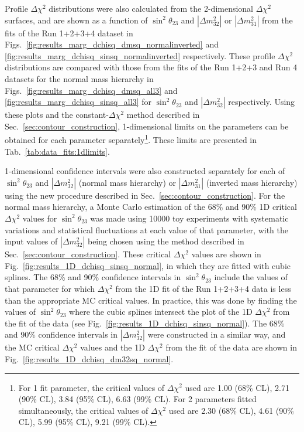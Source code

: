 Profile $\Delta\chi^2$ distributions were also calculated from the 2-dimensional $\Delta\chi^2$ surfaces, and are shown as a 
function of $\sin^{2}\theta_{23}$ and $|\Delta m^{2}_{32}|$ or $|\Delta m^{2}_{31}|$ from the
fits of the Run 1+2+3+4 dataset in 
Figs.\ \ref{fig:results_marg_dchisq_dmsq_normalinverted} and \ref{fig:results_marg_dchisq_sinsq_normalinverted} respectively.
These profile $\Delta\chi^2$ distributions are compared with those from the fits of the Run 1+2+3 and Run 4 datasets for the normal 
mass hierarchy in Figs.\ \ref{fig:results_marg_dchisq_dmsq_all3} and \ref{fig:results_marg_dchisq_sinsq_all3}
for $\sin^{2}\theta_{23}$ and $|\Delta m^{2}_{32}|$ respectively.
Using these plots and the constant-$\Delta\chi^2$ method described in Sec.\ \ref{sec:contour_construction},
1-dimensional limits on the parameters can be obtained for each parameter separately\footnote{
For 1 fit parameter, the critical values of $\Delta{\chi^{2}}$ used are 
1.00 (68\% CL), 2.71 (90\% CL), 3.84 (95\% CL), 6.63 (99\% CL).
For 2 parameters fitted simultaneously, the critical values of $\Delta{\chi^{2}}$ used are 
2.30 (68\% CL), 4.61 (90\% CL), 5.99 (95\% CL), 9.21 (99\% CL).
}.
These limits are presented in Tab.\ \ref{tab:data_fits:1dlimits}.

1-dimensional confidence intervals were also constructed separately for each of $\sin^2 \theta_{23}$ and $|\Delta m_{32}^{2}|$ (normal mass hierarchy) 
or $|\Delta m_{31}^{2}|$ (inverted mass hierarchy) using the new procedure described in Sec.\ \ref{sec:contour_construction}. For the normal 
mass hierarchy, a Monte Carlo estimation of the 68\% and 90\% 1D critical $\Delta\chi^{2}$ values for $\sin^2 \theta_{23}$ was made using 
10000 toy experiments with systematic variations and statistical fluctuations at each value of that parameter, with the input values of 
$|\Delta m_{32}^{2}|$ being chosen using the method described in Sec.\ \ref{sec:contour_construction}. These critical $\Delta\chi^{2}$ values are shown in 
Fig.\ \ref{fig:results_1D_dchisq_sinsq_normal}, in which they are fitted with cubic splines. The 68\% and 90\% confidence intervals in 
$\sin^2 \theta_{23}$ include the values of that parameter for which $\Delta\chi^{2}$ from the 1D fit of the Run 1+2+3+4 data is less than the 
appropriate MC critical values. In practice, this was done by finding the values of $\sin^2 \theta_{23}$ where the cubic splines intersect the 
plot of the 1D $\Delta\chi^{2}$ from the fit of the data (see Fig.\ \ref{fig:results_1D_dchisq_sinsq_normal}). The 68\% and 90\% confidence 
intervals in $|\Delta m_{32}^{2}|$ were constructed in a similar way, and the MC critical $\Delta\chi^{2}$ values and the 1D $\Delta\chi^{2}$ 
from the fit of the data are shown in Fig.\ \ref{fig:results_1D_dchisq_dm32sq_normal}. 

